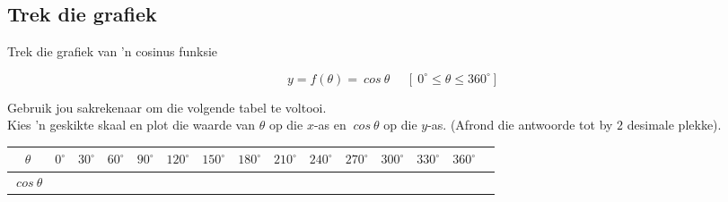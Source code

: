 \subsection*{Trek die grafiek}
\begin{wex}
{Trek die grafiek van ’n cosinus funksie
}
{
\begin{equation*}
  y=f(\theta)=~cos~  \theta~~~~~~[~0^{\circ} \leq \theta \leq 360^{\circ}]
\end{equation*}

Gebruik jou sakrekenaar om die volgende tabel te voltooi.\\
Kies ’n geskikte skaal en plot die waarde van $\theta$ op die $x$-as en $~cos~\theta$ op die $y$-as. (Afrond
die antwoorde tot by $2$ desimale plekke).

\begin{table}[H]
\begin{center}
\begin{tabular}{|c|m{0.3cm}|m{0.3cm}|m{0.3cm}|m{0.5cm}|m{0.5cm}|m{0.5cm}|m{0.5cm}|m{0.5cm}|m{0.5cm}|m{0.5cm}|m{0.5cm}|m{0.5cm}|m{0.5cm}|} \hline

\footnotesize$\theta $&
\footnotesize$0^{\circ }$&
\footnotesize$30^{\circ }$&
\footnotesize$60^{\circ }$&
\footnotesize$90^{\circ }$&
\footnotesize$120^{\circ }$&
\footnotesize$150^{\circ }$&
\footnotesize$180^{\circ }$&
\footnotesize$210^{\circ }$&
\footnotesize$240^{\circ }$&
\footnotesize$270^{\circ }$&
\footnotesize$300^{\circ }$&
\footnotesize$330^{\circ }$&
\footnotesize$360^{\circ }$
\\ \hline

\footnotesize$~cos~\theta $&
&
&
&
&
&
&
&
&
&
&
&
&
&

 \hline
\end{tabular}
\end{center}
\end{table}
}
{
\begin{table}[H]

\begin{center}


\end{center}
\end{table}}
\end{wex}

